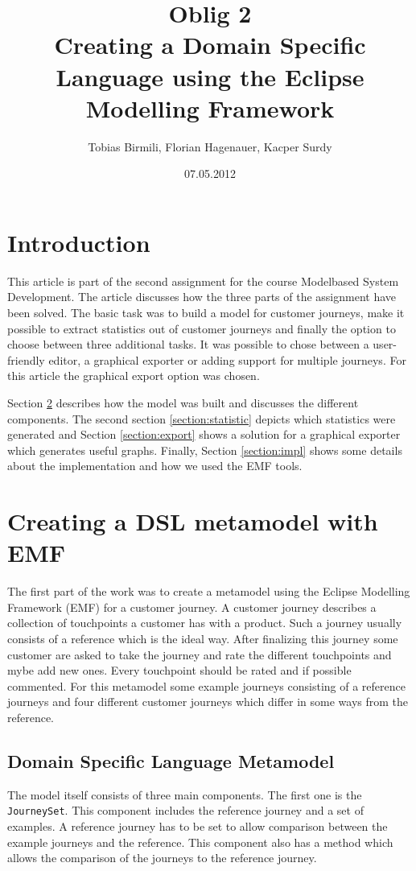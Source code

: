 \documentclass[12pt]{scrartcl}
\title{Oblig 2 \\ Creating a Domain Specific Language using the Eclipse Modelling Framework}
\author{Tobias Birmili, Florian Hagenauer, Kacper Surdy}
\date{07.05.2012}
\begin{document}
\maketitle

\tableofcontents

\section{Introduction}

This article is part of the second assignment for the course Modelbased System Development. The article discusses
how the three parts of the assignment have been solved. The basic task was to build a model for customer journeys,
make it possible to extract statistics out of customer journeys and finally the option to choose between three
additional tasks. It was possible to chose between a user-friendly editor, a graphical exporter or adding support
for multiple journeys. For this article the graphical export option was chosen.

Section \ref{section:model} describes how the model was built and discusses the different components. The second
section \ref{section:statistic} depicts which statistics were generated and Section \ref{section:export}
shows a solution for a graphical exporter which generates useful graphs. Finally, Section \ref{section:impl} shows
some details about the implementation and how we used the EMF tools.

\section{Creating a DSL metamodel with EMF} 
\label{section:model}

The first part of the work was to create a metamodel using the Eclipse Modelling Framework (EMF) for a customer
journey. A customer journey describes a collection of touchpoints a customer has with a product. Such a journey
usually consists of a reference which is the ideal way. After finalizing this journey some customer are asked
to take the journey and rate the different touchpoints and mybe add new ones. Every touchpoint should be rated
and if possible commented. For this metamodel some example journeys consisting of a reference journeys and four
different customer journeys which differ in some ways from the reference. 

\subsection{Domain Specific Language Metamodel}
The model itself consists of three main components. The first one is the \lstinline!JourneySet!. This component
includes the reference journey and a set of examples. A reference journey has to be set to allow comparison
between the example journeys and the reference. This component also has a method which allows the comparison
of the journeys to the reference journey. 
\end{document}
